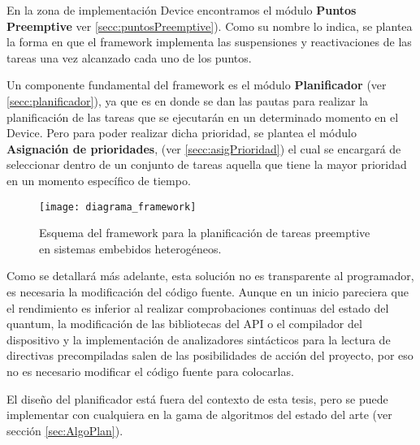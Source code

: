 En la zona de implementación Device encontramos el módulo \textbf{Puntos Preemptive} ver \ref{secc:puntosPreemptive}). Como su nombre lo indica, se plantea la forma en que el framework implementa las suspensiones y reactivaciones de las tareas una vez alcanzado cada uno de los puntos. 

Un componente fundamental del framework es el módulo \textbf{Planificador} (ver \ref{secc:planificador}), ya que es en donde se dan las pautas para realizar la planificación de las tareas que se ejecutarán en un determinado momento en el Device. Pero para poder realizar dicha prioridad, se plantea el módulo \textbf{Asignación de prioridades}, (ver \ref{secc:asigPrioridad}) el cual se encargará de seleccionar dentro de un conjunto de tareas aquella que tiene la mayor prioridad en un momento específico de tiempo.
\newline

  \begin{figure}[!]
        \texttt{[image: diagrama\_framework]}
        \caption{Esquema del framework para la planificación de tareas preemptive en sistemas embebidos heterogéneos.}
        \label{fig:diagramabase}
    \end{figure}
  
  

Como se detallará más adelante, esta solución no es transparente al programador, es necesaria la modificación del código fuente. Aunque en un inicio pareciera que el rendimiento es inferior al realizar comprobaciones continuas del estado del quantum, la modificación de las bibliotecas del API o el compilador del dispositivo y la implementación de analizadores sintácticos para la lectura de directivas precompiladas salen de las posibilidades de acción del proyecto, 
por eso no es necesario modificar el código fuente para colocarlas.
\newline 

El diseño del planificador está fuera del contexto de esta tesis, pero se puede implementar con cualquiera en la gama de algoritmos del estado del arte (ver sección \ref{sec:AlgoPlan}).


